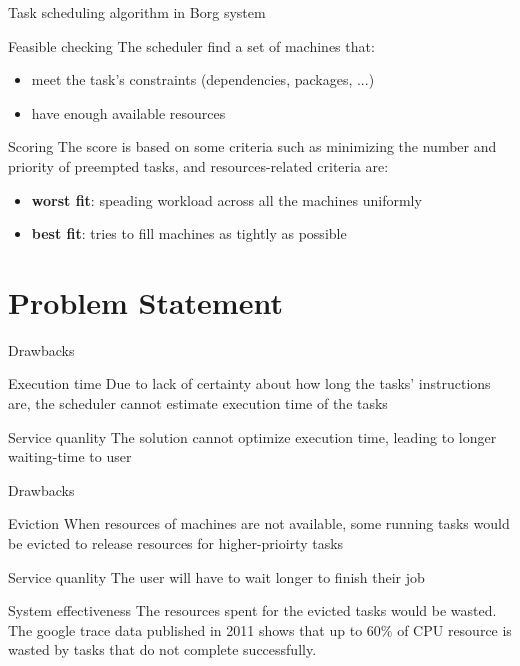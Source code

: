 \documentclass[10pt,xcolor={dvipsnames}, aspectratio=169]{beamer}
\begin{document}
\begin{frame}
{Task scheduling algorithm in Borg system}
	\begin{block}
	{Feasible checking}
	The scheduler find a set of machines that: 
		\begin{itemize}
			\item meet the task's constraints (dependencies, packages, ...)
			\item have enough available resources
		\end{itemize}
	\end{block}
	
	\begin{block}
	{Scoring}
		The score is based on some criteria such as minimizing the number and priority of preempted tasks, and resources-related criteria are: 
		\begin{itemize}
			\item \textbf{worst fit}: speading workload across all the machines uniformly
			\item \textbf{best fit}: tries to fill machines as tightly as possible
		\end{itemize}
	\end{block}
\end{frame}

\section{Problem Statement}

\begin{frame}
{Drawbacks} 

	\begin{block}
	{Execution time} 
	Due to lack of certainty about how long the tasks' instructions are, the scheduler cannot estimate execution time of the tasks
	\end{block}
	
	\begin{block}
	{Service quanlity} 
	The solution cannot optimize execution time, leading to longer waiting-time to user	
	\end{block}
\end{frame}

\begin{frame}
{Drawbacks} 
	
	\begin{block}
	{Eviction}
	When resources of machines are not available, some running tasks would be evicted to release resources for higher-prioirty tasks
	\end{block}
	
	\begin{block}
	{Service quanlity}
	The user will have to wait longer to finish their job
	\end{block}
	
	\begin{block}
	{System effectiveness}
	The resources spent for the evicted tasks would be wasted. The google trace data published in 2011 shows that 
	up to 60\% of CPU resource is wasted by tasks that do not complete successfully.
	\end{block}
\end{frame}
\end{document}
